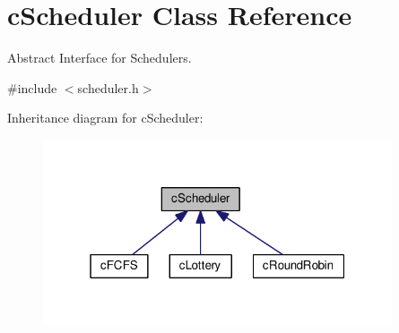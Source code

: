 \hypertarget{classcScheduler}{\section{c\-Scheduler \-Class \-Reference}
\label{d0/d21/classcScheduler}
}


\-Abstract \-Interface for \-Schedulers.  




{\ttfamily \#include $<$scheduler.\-h$>$}



\-Inheritance diagram for c\-Scheduler\-:\nopagebreak
\begin{figure}[H]
\begin{center}
\leavevmode
\includegraphics[width=292pt]{d8/dde/classcScheduler__inherit__graph}
\end{center}
\end{figure}
